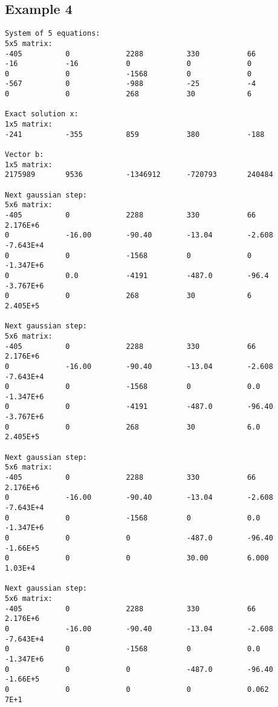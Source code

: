 \documentclass[letterpaper,12pt]{article}
\begin{document}
\subsection{Example 4}
\label{a:E4}
\begin{verbatim}
System of 5 equations:
5x5 matrix:
-405          0             2288          330           66            
-16           -16           0             0             0             
0             0             -1568         0             0             
-567          0             -988          -25           -4            
0             0             268           30            6             

Exact solution x:
1x5 matrix:
-241          -355          859           380           -188          

Vector b:
1x5 matrix:
2175989       9536          -1346912      -720793       240484        

Next gaussian step:
5x6 matrix:
-405          0             2288          330           66            2.176E+6      
0             -16.00        -90.40        -13.04        -2.608        -7.643E+4     
0             0             -1568         0             0             -1.347E+6     
0             0.0           -4191         -487.0        -96.4         -3.767E+6     
0             0             268           30            6             2.405E+5      

Next gaussian step:
5x6 matrix:
-405          0             2288          330           66            2.176E+6      
0             -16.00        -90.40        -13.04        -2.608        -7.643E+4     
0             0             -1568         0             0.0           -1.347E+6     
0             0             -4191         -487.0        -96.40        -3.767E+6     
0             0             268           30            6.0           2.405E+5      

Next gaussian step:
5x6 matrix:
-405          0             2288          330           66            2.176E+6      
0             -16.00        -90.40        -13.04        -2.608        -7.643E+4     
0             0             -1568         0             0.0           -1.347E+6     
0             0             0             -487.0        -96.40        -1.66E+5      
0             0             0             30.00         6.000         1.03E+4       

Next gaussian step:
5x6 matrix:
-405          0             2288          330           66            2.176E+6      
0             -16.00        -90.40        -13.04        -2.608        -7.643E+4     
0             0             -1568         0             0.0           -1.347E+6     
0             0             0             -487.0        -96.40        -1.66E+5      
0             0             0             0             0.062         7E+1          


\end{verbatim}
\end{document}

